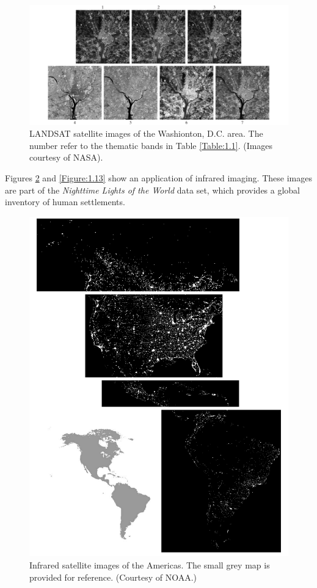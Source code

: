 \documentclass[12pt,a4paper,twoside,openany]{book}
\begin{document}
\begin{figure}[htbp]
    \centering
    \includegraphics[width=\linewidth]{Figure1 10.png}
    \caption{LANDSAT satellite images of the Washionton, D.C. area. The number refer to the thematic bands in Table \ref{Table:1.1}. (Images courtesy of NASA).}
    \label{Figure:1.10}
\end{figure}

Figures \ref{Figure:1.12} and \ref{Figure:1.13} show an application of infrared imaging. These images are part of the \textit{Nighttime Lights of the World} data set, which provides a global inventory of human settlements.

\begin{figure}[htbp]
    \centering
    \includegraphics[width=\linewidth]{Figure1 12.jpeg}
    \caption{Infrared satellite images of the Americas. The small grey map is provided for reference. (Courtesy of NOAA.)}
    \label{Figure:1.12}
\end{figure}
\end{document}
